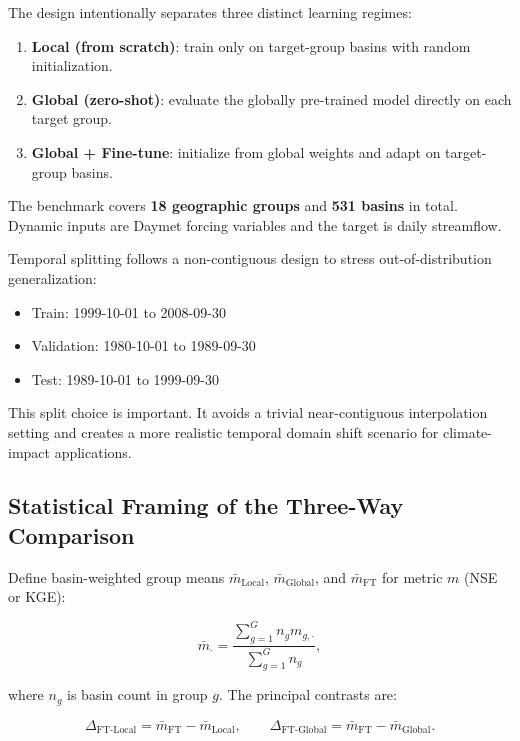\documentclass[
]{krantz}
\providecommand{\tightlist}{%
  \setlength{\itemsep}{0pt}\setlength{\parskip}{0pt}}
\begin{document}
The design intentionally separates three distinct learning regimes:

\begin{enumerate}
\def\labelenumi{\arabic{enumi}.}
\tightlist
\item
  \textbf{Local (from scratch)}: train only on target-group basins with random
  initialization.
\item
  \textbf{Global (zero-shot)}: evaluate the globally pre-trained model directly on each
  target group.
\item
  \textbf{Global + Fine-tune}: initialize from global weights and adapt on target-group
  basins.
\end{enumerate}

The benchmark covers \textbf{18 geographic groups} and \textbf{531 basins} in total. Dynamic
inputs are Daymet forcing variables and the target is daily streamflow.

Temporal splitting follows a non-contiguous design to stress out-of-distribution
generalization:

\begin{itemize}
\tightlist
\item
  Train: 1999-10-01 to 2008-09-30
\item
  Validation: 1980-10-01 to 1989-09-30
\item
  Test: 1989-10-01 to 1999-09-30
\end{itemize}

This split choice is important. It avoids a trivial near-contiguous interpolation
setting and creates a more realistic temporal domain shift scenario for climate-impact
applications.

\subsection{Statistical Framing of the Three-Way Comparison}\label{statistical-framing-of-the-three-way-comparison}

Define basin-weighted group means \(\bar{m}_{\text{Local}}\),
\(\bar{m}_{\text{Global}}\), and \(\bar{m}_{\text{FT}}\) for metric \(m\) (NSE or KGE):

\[
\bar{m}_{\cdot} = \frac{\sum_{g=1}^{G} n_g m_{g,\cdot}}{\sum_{g=1}^{G} n_g},
\]

where \(n_g\) is basin count in group \(g\). The principal contrasts are:

\[
\Delta_{\text{FT-Local}} = \bar{m}_{\text{FT}} - \bar{m}_{\text{Local}}, \qquad
\Delta_{\text{FT-Global}} = \bar{m}_{\text{FT}} - \bar{m}_{\text{Global}}.
\]
\end{document}
